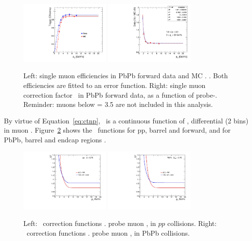 \begin{figure}[t]
  \begin{center}
    \includegraphics[width=0.4\textwidth]{Chapters/aCorrection/tnp_trig_eff_pbpb_forward.pdf}
    \includegraphics[width=0.4\textwidth]{Chapters/aCorrection/tnp_trig_eff_dataMC_Ratio_pbpb_forward.pdf}
    \caption{
      Left: single muon efficiencies in PbPb forward data and MC
      \vs. \pt. Both efficiencies are fitted to an error function.
      Right: single muon correction factor \Ctnp\ in PbPb forward
      data, as a function of probe-\pt. Reminder: muons below \pt = 3.5 \GeVc
      are not included in this analysis.
    }
    \label{fig:ctnp_fits}
  \end{center}
\end{figure}
By virtue of Equation~\ref{eq:ctnp}, \Ctnp\ is a continuous function of
\pt, differential (2 bins) in muon \Pgh. Figure~\ref{fig:SF} shows the \Ctnp\ functions for pp, barrel and
forward, and for PbPb, barrel and endcap regions .
\begin{figure}[h]
  \begin{center}
    \includegraphics[width=0.4\textwidth]{Chapters/aCorrection/scale_factor_pp.pdf}
    \includegraphics[width=0.4\textwidth]{Chapters/aCorrection/scale_factor_pbpb.pdf}
    \caption{
      Left: \Ctnp\ correction functions \vs. probe muon \pt, in $pp$ collisions.
      Right: \Ctnp\ correction functions \vs. probe muon \pt, in PbPb collisions.
    }
    \label{fig:SF}
  \end{center}
\end{figure}


